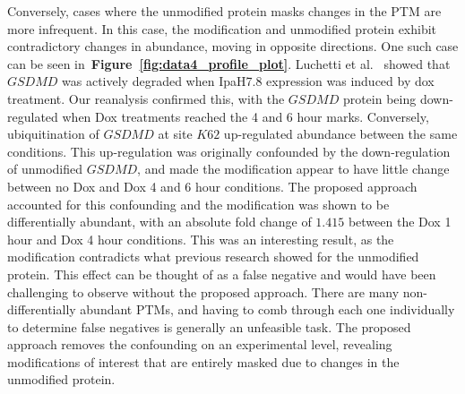 \documentclass[mcp]{article}
\numberwithin{table}{section}
\def\todo#1{{\color{red}[#1]}}
\def\figref#1{{\bf Figure~\ref{fig:#1}}}
\begin{document}
Conversely, cases where the unmodified protein masks changes in the PTM are more infrequent. In this case, the modification and unmodified protein exhibit contradictory changes in abundance, moving in opposite directions. One such case can be seen in~\figref{data4_profile_plot}. Luchetti et al.~\cite{LUCHETTI2021} showed that $GSDMD$ was actively degraded when IpaH7.8 expression was induced by dox treatment. Our reanalysis confirmed this, with the $GSDMD$ protein being down-regulated when Dox treatments reached the 4 and 6 hour marks. Conversely, ubiquitination of $GSDMD$ at site $K62$ up-regulated abundance between the same conditions. This up-regulation was originally confounded by the down-regulation of unmodified $GSDMD$, and made the modification appear to have little change between no Dox and Dox 4 and 6 hour conditions. The proposed approach accounted for this confounding and the modification was shown to be differentially abundant, with an absolute fold change of $1.415$ between the Dox 1 hour and Dox 4 hour conditions. This was an interesting result, as the modification contradicts what previous research showed for the unmodified protein. This effect can be thought of as a false negative and would have been challenging to observe without the proposed approach. There are many non-differentially abundant PTMs, and having to comb through each one individually to determine false negatives is generally an unfeasible task. The proposed approach removes the confounding on an experimental level, revealing modifications of interest that are entirely masked due to changes in the unmodified protein.


\end{document}
